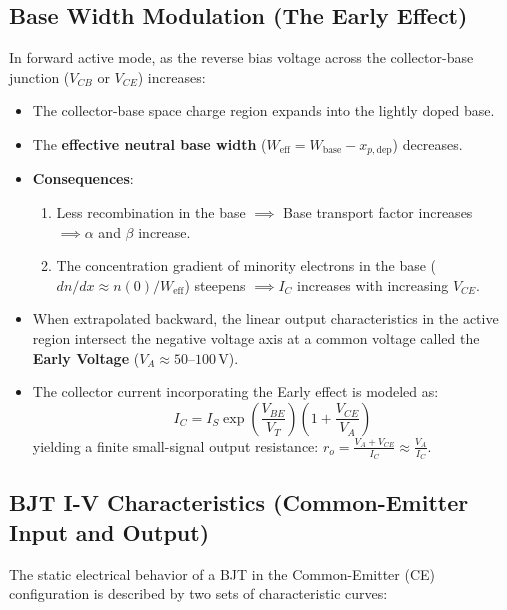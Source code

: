 \documentclass[12pt,a4paper]{article}
\begin{document}
\subsection{Base Width Modulation (The Early Effect)}
In forward active mode, as the reverse bias voltage across the collector-base junction ($V_{CB}$ or $V_{CE}$) increases:
\begin{itemize}[leftmargin=*, itemsep=3pt]
  \item The collector-base space charge region expands into the lightly doped base.
  \item The \textbf{effective neutral base width} ($W_{\text{eff}} = W_{\text{base}} - x_{p,\text{dep}}$) decreases.
  \item \textbf{Consequences}:
    \begin{enumerate}
      \item Less recombination in the base $\implies$ Base transport factor increases $\implies \alpha$ and $\beta$ increase.
      \item The concentration gradient of minority electrons in the base ($dn/dx \approx n(0)/W_{\text{eff}}$) steepens $\implies I_C$ increases with increasing $V_{CE}$.
    \end{enumerate}
  \item When extrapolated backward, the linear output characteristics in the active region intersect the negative voltage axis at a common voltage called the \textbf{Early Voltage} ($V_A \approx 50\text{--}100\,\text{V}$).
  \item The collector current incorporating the Early effect is modeled as:
  \begin{equation}
    I_C = I_S \exp\left(\frac{V_{BE}}{V_T}\right) \left( 1 + \frac{V_{CE}}{V_A} \right)
  \end{equation}
  yielding a finite small-signal output resistance: $r_o = \frac{V_A + V_{CE}}{I_C} \approx \frac{V_A}{I_C}$.
\end{itemize}

\subsection{BJT I-V Characteristics (Common-Emitter Input and Output)}
The static electrical behavior of a BJT in the Common-Emitter (CE) configuration is described by two sets of characteristic curves:
\end{document}
